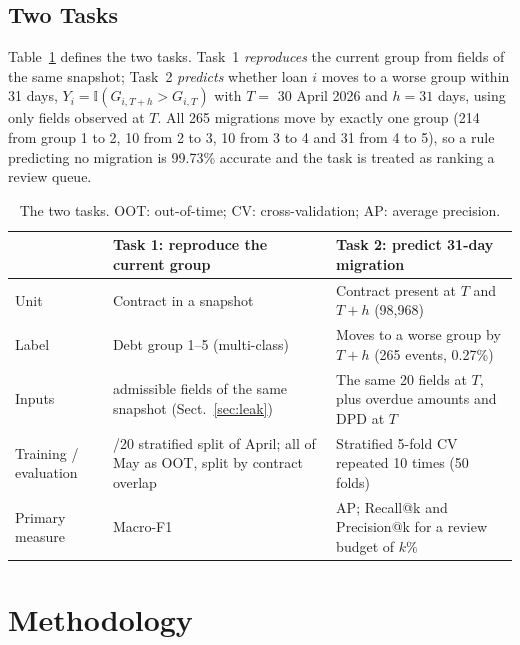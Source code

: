 \documentclass[runningheads]{llncs}
\begin{document}
\subsection{Two Tasks}

Table~\ref{tab:tasks} defines the two tasks. Task~1 \emph{reproduces} the current group from fields of the same snapshot; Task~2 \emph{predicts} whether loan $i$ moves to a worse group within 31 days, $Y_i=\mathbb{I}(G_{i,T+h}>G_{i,T})$ with $T=$ 30 April 2026 and $h=31$ days, using only fields observed at $T$. All 265 migrations move by exactly one group (214 from group 1 to 2, 10 from 2 to 3, 10 from 3 to 4 and 31 from 4 to 5), so a rule predicting no migration is 99.73\% accurate and the task is treated as ranking a review queue.

\begin{table}[t]
\centering
\caption{The two tasks. OOT: out-of-time; CV: cross-validation; AP: average precision.}
\label{tab:tasks}
\scriptsize
\begin{tabular}{@{}>{\raggedright\arraybackslash}p{1.7cm}>{\raggedright\arraybackslash}p{4.6cm}>{\raggedright\arraybackslash}p{5.3cm}@{}}
\toprule
& Task 1: reproduce the current group & Task 2: predict 31-day migration\\
\midrule
Unit & Contract in a snapshot & Contract present at $T$ and $T+h$ (98,968)\\
Label & Debt group 1--5 (multi-class) & Moves to a worse group by $T+h$ (265 events, 0.27\%)\\
Inputs & 20 admissible fields of the same snapshot (Sect.~\ref{sec:leak}) & The same 20 fields at $T$, plus overdue amounts and DPD at $T$\\
Training / evaluation & 80/20 stratified split of April; all of May as OOT, split by contract overlap & Stratified 5-fold CV repeated 10 times (50 folds)\\
Primary measure & Macro-F1 & AP; Recall@k and Precision@k for a review budget of $k\%$\\
\bottomrule
\end{tabular}
\end{table}

\section{Methodology}
\label{sec:method}
\end{document}
